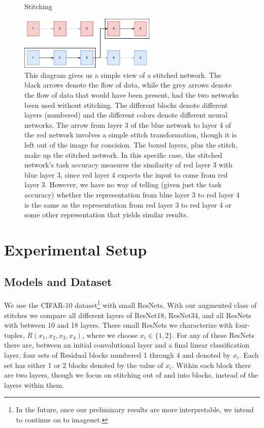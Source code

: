 \documentclass{article} %
\begin{document}
\begin{center}
   \begin{figure}[h!]
      \centering
      \caption{Stitching}
      \includegraphics[width=6.5cm]{stitch.jpg}
      \caption*{This diagram gives us a simple view of a stitched network. The black arrows denote the flow of data, while
      the grey arrows denote the flow of data that would have been present, had the two networks been used without stitching.
      The different blocks denote different layers (numbered) and the different colors denote different neural networks. The arrow
      from layer 3 of the blue network to layer 4 of the red network involves a simple stitch transformation, though it is left
      out of the image for concision. The boxed layers, plus the stitch, make up the stitched network. In this specific case,
      the stitched network's task accuracy measures the similarity of red layer 3 with blue layer 3, since red layer 4 expects the
      input to come from red layer 3. However, we have no way of telling (given just the task accuracy) whether the representation
      from blue layer 3 to red layer 4 is the same as the representation from red layer 3 to red layer 4 or some other representation
      that yields similar results.}
   \end{figure}
\end{center}

\section*{Experimental Setup}
\subsection*{Models and Dataset}
We use the CIFAR-10 dataset\footnote{In the future, once our preliminary results are more interpretable, we intend to
continue on to imagenet.} with small ResNets. With our augmented class of stitches we compare all different
layers of ResNet18, ResNet34, and all
ResNets with between 10 and 18 layers. These small ResNets we characterize with four-tuples,
$R(x_1, x_2, x_3, x_4)$, where we choose $x_i \in \{1, 2\}$. For any of these ResNets there are, between an initial convolutional
layer and a final linear classification layer, four sets of Residual blocks numbered 1 through 4 and denoted by
$x_i$. Each set has either 1 or 2 blocks denoted by the value of $x_i$. Within each block there are two layers,
though we focus on stitching out of and into blocks, instead of the layers within them. 
\end{document}
